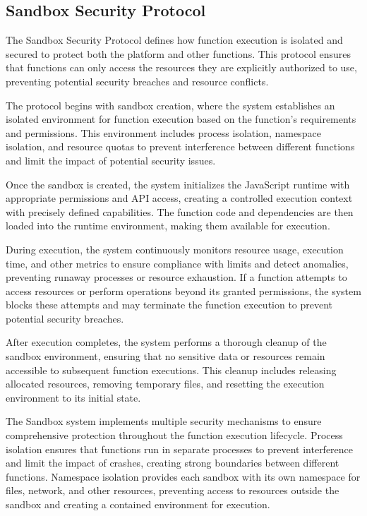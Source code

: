 \documentclass[12pt,a4paper]{article}
\begin{document}
\subsection{Sandbox Security Protocol}
\label{subsec:sandbox-protocol-spec}

The Sandbox Security Protocol defines how function execution is isolated and secured to protect both the platform and other functions. This protocol ensures that functions can only access the resources they are explicitly authorized to use, preventing potential security breaches and resource conflicts.



The protocol begins with sandbox creation, where the system establishes an isolated environment for function execution based on the function's requirements and permissions. This environment includes process isolation, namespace isolation, and resource quotas to prevent interference between different functions and limit the impact of potential security issues.

Once the sandbox is created, the system initializes the JavaScript runtime with appropriate permissions and API access, creating a controlled execution context with precisely defined capabilities. The function code and dependencies are then loaded into the runtime environment, making them available for execution.

During execution, the system continuously monitors resource usage, execution time, and other metrics to ensure compliance with limits and detect anomalies, preventing runaway processes or resource exhaustion. If a function attempts to access resources or perform operations beyond its granted permissions, the system blocks these attempts and may terminate the function execution to prevent potential security breaches.

After execution completes, the system performs a thorough cleanup of the sandbox environment, ensuring that no sensitive data or resources remain accessible to subsequent function executions. This cleanup includes releasing allocated resources, removing temporary files, and resetting the execution environment to its initial state.

The Sandbox system implements multiple security mechanisms to ensure comprehensive protection throughout the function execution lifecycle. Process isolation ensures that functions run in separate processes to prevent interference and limit the impact of crashes, creating strong boundaries between different functions. Namespace isolation provides each sandbox with its own namespace for files, network, and other resources, preventing access to resources outside the sandbox and creating a contained environment for execution.
\end{document}
